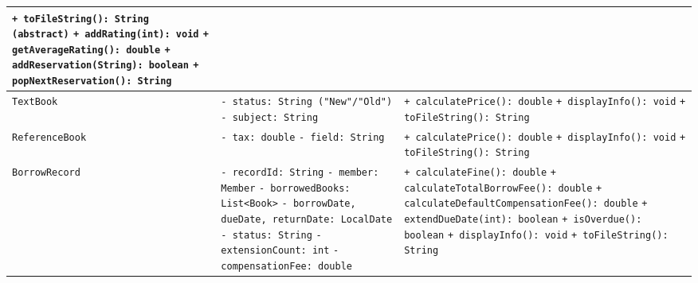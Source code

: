 \documentclass[12pt,a4paper]{article}
\begin{document}
\begin{longtable}{p{3.0cm} p{5.5cm} p{6.2cm}}
    \texttt{+ toFileString(): String (abstract)} \newline
    \texttt{+ addRating(int): void} \newline
    \texttt{+ getAverageRating(): double} \newline
    \texttt{+ addReservation(String): boolean} \newline
    \texttt{+ popNextReservation(): String} \\
    \hline
    \texttt{TextBook} &
    \texttt{- status: String ("New"/"Old")} \newline
    \texttt{- subject: String} &
    \texttt{+ calculatePrice(): double} \newline
    \texttt{+ displayInfo(): void} \newline
    \texttt{+ toFileString(): String} \\
    \hline
    \texttt{ReferenceBook} &
    \texttt{- tax: double} \newline
    \texttt{- field: String} &
    \texttt{+ calculatePrice(): double} \newline
    \texttt{+ displayInfo(): void} \newline
    \texttt{+ toFileString(): String} \\
    \hline
    \texttt{BorrowRecord} &
    \texttt{- recordId: String} \newline
    \texttt{- member: Member} \newline
    \texttt{- borrowedBooks: List<Book>} \newline
    \texttt{- borrowDate, dueDate, returnDate: LocalDate} \newline
    \texttt{- status: String} \newline
    \texttt{- extensionCount: int} \newline
    \texttt{- compensationFee: double} &
    \texttt{+ calculateFine(): double} \newline
    \texttt{+ calculateTotalBorrowFee(): double} \newline
    \texttt{+ calculateDefaultCompensationFee(): double} \newline
    \texttt{+ extendDueDate(int): boolean} \newline
    \texttt{+ isOverdue(): boolean} \newline
    \texttt{+ displayInfo(): void} \newline
    \texttt{+ toFileString(): String} \\
    \hline
\end{longtable}
\end{document}
